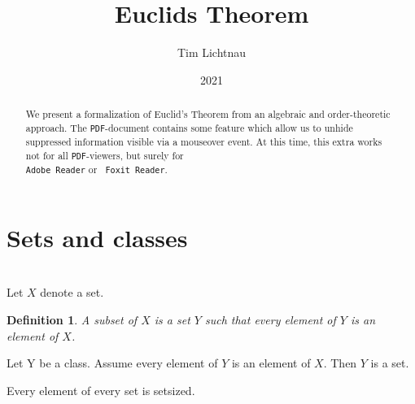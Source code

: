 \documentclass{article}
\title{Euclids Theorem}
\author{Tim Lichtnau}
\date{2021}
\newtheorem*{definition}{Definition}
\begin{document}
\maketitle
\begin{abstract}
\noindent	We present a formalization of Euclid's Theorem from an algebraic and order-theoretic approach. The \texttt{PDF}-document contains some feature which allow us to unhide suppressed information visible via a mouseover event. At this time, this extra works not for all \texttt{PDF}-viewers, but surely for \\
\texttt{Adobe Reader} or \texttt{ Foxit Reader}.
\end{abstract}
\tableofcontents

\section{Sets and classes}
\begin{forthel}
	 \\
	Let $X$ denote a set.
	\begin{definition}
		A subset of $X$ is a set $Y$ such that every element of $Y$ is an element of $X$.
	\end{definition}
	\begin{axiom}
		Let Y be a class. Assume every element of $Y$ is an element of $X$. Then $Y$ is a set.
	\end{axiom}
	\begin{axiom}
		Every element of every set is setsized.
	\end{axiom}
	
\end{forthel}
\end{document}
